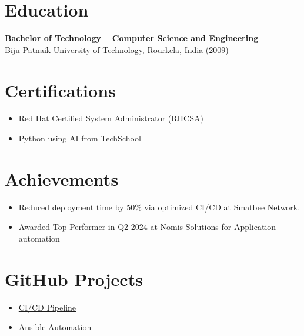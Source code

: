\documentclass[11pt,a4paper]{article}
\begin{document}

\section*{Education}
\textbf{Bachelor of Technology – Computer Science and Engineering} \\
Biju Patnaik University of Technology, Rourkela, India (2009)

\section*{Certifications}
\begin{itemize}[leftmargin=*]
  \item Red Hat Certified System Administrator (RHCSA) 
  \item Python using AI from TechSchool 
\end{itemize}

\section*{Achievements}
\begin{itemize}[leftmargin=*]
  \item Reduced deployment time by 50\% via optimized CI/CD at Smatbee Network. 
  \item Awarded Top Performer in Q2 2024 at Nomis Solutions for Application automation 
\end{itemize}

\section*{GitHub Projects}
\begin{itemize}[leftmargin=*]
  \item \href{https://github.com/satyakaibm/jenkins-resources.git}{CI/CD Pipeline}  \\
  \item \href{https://github.com/satyakaibm/Ansible_practice.git}{Ansible Automation} 
\end{itemize}
\end{document}
